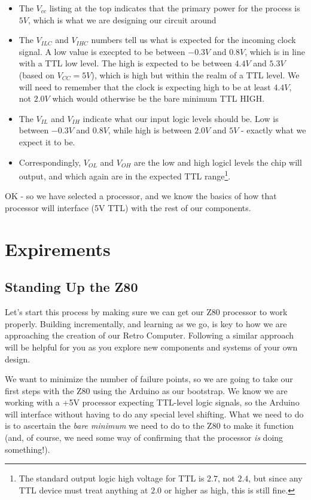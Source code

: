 \documentclass[10pt]{report}
\begin{document}
\begin{itemize}
\item The $V_{cc}$ listing at the top indicates that the primary power for the process is $5V$, which is what we are designing our circuit around
\item The $V_{ILC}$ and $V_{IHC}$ numbers tell us what is expected for the incoming clock signal. A low value is execpted to be between $-0.3V$ and $0.8V$, which is in line with a TTL low level. The high is expected to be between $4.4V$ and $5.3V$ (based on $V_{CC} = 5V$), which is high but within the realm of a TTL level. We will need to remember that the clock is expecting high to be at least $4.4V$, not $2.0V$ which would otherwise be the bare minimum TTL HIGH.
\item The $V_{IL}$ and $V_{IH}$ indicate what our input logic levels should be. Low is between $-0.3V$ and $0.8V$, while high is between $2.0V$ and $5V$ - exactly what we expect it to be. 
\item Correspondingly, $V_{OL}$ and $V_{OH}$ are the low and high logicl levels the chip will output, and which again are in the expected TTL range\footnote{The standard output logic high voltage for TTL is $2.7$, not $2.4$, but since any TTL device must treat anything at $2.0$ or higher as high, this is still fine.}.
\end{itemize}

OK - so we have selected a processor, and we know the basics of how that processor will interface (5V TTL) with the rest of our components. 

\chapter{Expirements}
\section{Standing Up the Z80}

Let's start this process by making sure we can get our Z80 processor to work properly. Building incrementally, and learning as we go,
is key to how we are approaching the creation of our Retro Computer. Following a similar approach will be helpful for you as you explore new components and systems of your own design.

We want to minimize the number of failure points, so we are going to take our first steps with the Z80 using the Arduino as our bootstrap. We know we are working with a +5V processor expecting TTL-level logic signals, so the Arduino will interface without having to do any special level shifting. What we need to do is to ascertain the \textit{bare minimum} we need to do to the Z80 to make it function (and, of course, we need some way of confirming that the processor \textit{is} doing something!).
\end{document}
